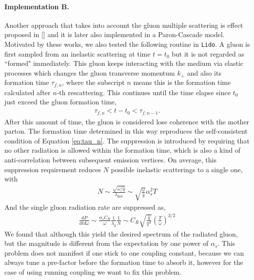 \documentclass[aps, prc, reprint, amsmath, groupedaddress, nofootinbib]{revtex4-1}
\begin{document}
\paragraph*{Implementation B.} Another approach that takes into account the gluon multiple scattering is effect proposed in [] and it is later also implemented in a Paron-Cascade model.
Motivated by these works, we also tested the following routine in {\tt Lido}. 
A gluon is first sampled from an inelastic scattering at time $t=t_0$ but it is not regarded as ``formed" immediately. 
This gluon keeps interacting with the medium via elastic processes which changes the gluon transverse momentum $k_\perp$ and also its formation time $\tau_{f,n}$, where the subscript $n$ means this is the formation time calculated after $n$-th rescattering.
This continues until the time elapse since $t_0$ just exceed the gluon formation time,
\begin{eqnarray}
\tau_{f, n} < t-t_0 < \tau_{f, n-1}.
\end{eqnarray}
After this amount of time, the gluon is considered lose coherence with the mother parton.
The formation time determined in this way reproduces the self-consistent condition of Equation \ref{eq:tau_n}.
The suppression is introduced by requiring that no other radiation is allowed within the formation time, which is also a kind of anti-correlation between subsequent emission vertices.
On average, this suppression requirement reduces $N$ possible inelastic scatterings to a single one, with
\begin{eqnarray}
N \sim \frac{\sqrt{\omega/\hat{q}} }{ \lambda_{\textrm{inel}}} \sim \sqrt{\frac{\omega}{\hat{q}}}\alpha_s^2 T
\end{eqnarray}
And the single gluon radiation rate are suppressed as,
\begin{eqnarray}\label{eq:PCM-spectra}
\frac{dP}{dt d\omega} \sim
 \frac{\alpha_s C_R}{\omega} \frac{1}{\lambda_g}\frac{1}{N} \sim C_R \sqrt{\frac{\hat{q}}{T^3}}\left(\frac{T}{\omega}\right)^{3/2}
\end{eqnarray}
We found that although this yield the desired spectrum of the radiated gluon, but the magnitude is different from the expectation by one power of $\alpha_s$. 
This problem does not manifest if one stick to one coupling constant, because we can always tune a pre-factor before the formation time to absorb it, however for the case of using running coupling we want to fix this problem.
\end{document}
